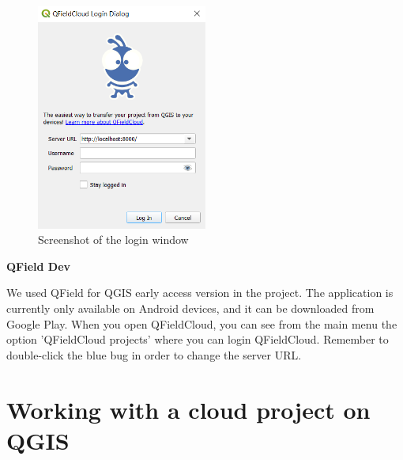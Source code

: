 \documentclass{article}
\begin{document}
\begin{figure}[H]
    \centering
    \includegraphics[width=0.5\textwidth]{login-qfieldsync.png}
    \caption{Screenshot of the login window}
    \label{fig:login-qfieldsync}
\end{figure}

\textbf{QField Dev}

We used QField for QGIS early access version in the project. The application is currently only available on Android devices, and it can be downloaded from Google Play. When you open QFieldCloud, you can see from the main menu the option 'QFieldCloud projects' where you can login QFieldCloud. Remember to double-click the blue bug in order to change the server URL. 


\section{Working with a cloud project on QGIS}
\end{document}

